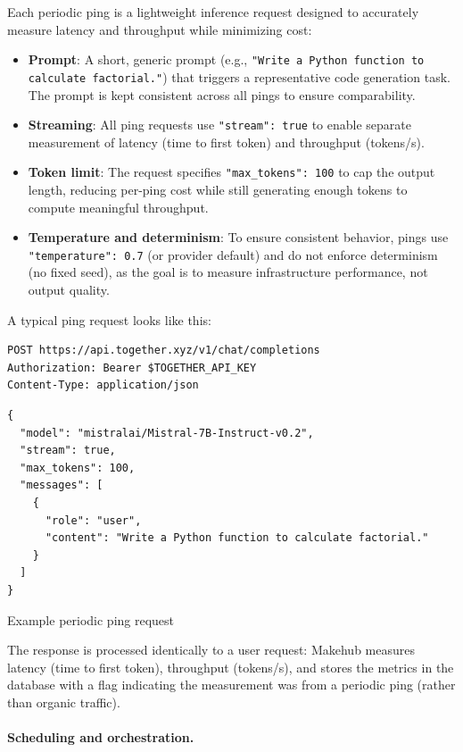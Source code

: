 \documentclass[english]{article}
\begin{document}
Each periodic ping is a lightweight inference request designed to accurately measure latency and throughput while minimizing cost:
\begin{itemize}
    \item \textbf{Prompt}: A short, generic prompt (e.g., \texttt{"Write a Python function to calculate factorial."}) that triggers a representative code generation task. The prompt is kept consistent across all pings to ensure comparability.
    \item \textbf{Streaming}: All ping requests use \texttt{"stream": true} to enable separate measurement of latency (time to first token) and throughput (tokens/s).
    \item \textbf{Token limit}: The request specifies \texttt{"max\_tokens": 100} to cap the output length, reducing per-ping cost while still generating enough tokens to compute meaningful throughput.
    \item \textbf{Temperature and determinism}: To ensure consistent behavior, pings use \texttt{"temperature": 0.7} (or provider default) and do not enforce determinism (no fixed seed), as the goal is to measure infrastructure performance, not output quality.
\end{itemize}

A typical ping request looks like this:

\begin{listing}[H]
\begin{verbatim}
POST https://api.together.xyz/v1/chat/completions
Authorization: Bearer $TOGETHER_API_KEY
Content-Type: application/json
\end{verbatim}
\begin{verbatim}
{
  "model": "mistralai/Mistral-7B-Instruct-v0.2",
  "stream": true,
  "max_tokens": 100,
  "messages": [
    {
      "role": "user",
      "content": "Write a Python function to calculate factorial."
    }
  ]
}
\end{verbatim}
\caption{Example periodic ping request}
\end{listing}

The response is processed identically to a user request: Makehub measures latency (time to first token), throughput (tokens/s), and stores the metrics in the database with a flag indicating the measurement was from a periodic ping (rather than organic traffic).

\paragraph{Scheduling and orchestration.}
\end{document}
